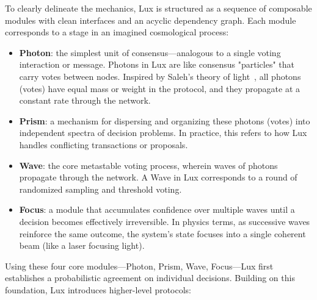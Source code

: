 To clearly delineate the mechanics, Lux is structured as a sequence of composable modules with clean interfaces and an acyclic dependency graph. Each module corresponds to a stage in an imagined cosmological process:

\begin{itemize}
\item \textbf{Photon}: the simplest unit of consensus—analogous to a single voting interaction or message. Photons in Lux are like consensus "particles" that carry votes between nodes. Inspired by Saleh's theory of light~\cite{saleh}, all photons (votes) have equal mass or weight in the protocol, and they propagate at a constant rate through the network.

\item \textbf{Prism}: a mechanism for dispersing and organizing these photons (votes) into independent spectra of decision problems. In practice, this refers to how Lux handles conflicting transactions or proposals.

\item \textbf{Wave}: the core metastable voting process, wherein waves of photons propagate through the network. A Wave in Lux corresponds to a round of randomized sampling and threshold voting.

\item \textbf{Focus}: a module that accumulates confidence over multiple waves until a decision becomes effectively irreversible. In physics terms, as successive waves reinforce the same outcome, the system's state focuses into a single coherent beam (like a laser focusing light).
\end{itemize}

Using these four core modules—Photon, Prism, Wave, Focus—Lux first establishes a probabilistic agreement on individual decisions. Building on this foundation, Lux introduces higher-level protocols:


